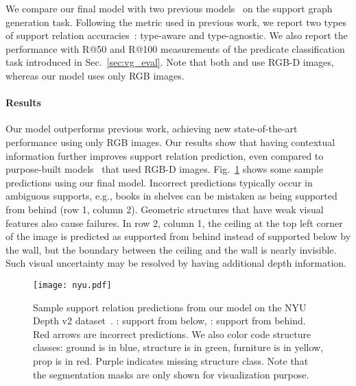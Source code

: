 \documentclass[10pt,twocolumn,letterpaper]{article}
\begin{document}
We compare our final model with two previous models~\cite{nyudepth,liao2016support} on the support graph generation task. Following the metric used in previous work, we report two types of support relation accuracies~\cite{nyudepth}: type-aware and type-agnostic. We also report the performance with R@50 and R@100 measurements of the predicate classification task introduced in Sec.~\ref{sec:vg_eval}. Note that both \cite{nyudepth} and \cite{liao2016support} use RGB-D images, whereas our model uses only RGB images.
 \vspace*{-15pt}

\paragraph{Results} Our model outperforms previous work, achieving new state-of-the-art performance using only RGB images. Our results show that having contextual information further improves support relation prediction, even compared to purpose-built models~\cite{liao2016support,nyudepth} that used RGB-D images. Fig.~\ref{fig:nyu} shows some sample predictions using our final model. Incorrect predictions typically occur in ambiguous supports, e.g., books in shelves can be mistaken as being supported from behind (row 1, column 2). Geometric structures that have weak visual features also cause failures. In row 2, column 1, the ceiling at the top left corner of the image is predicted as supported from behind instead of supported below by the wall, but the boundary between the ceiling and the wall is nearly invisible. Such visual uncertainty may be resolved by having additional depth information.



\begin{figure}[t!]
\begin{center}
\texttt{[image: nyu.pdf]}
\caption{Sample support relation predictions from our model on the NYU Depth v2 dataset~\cite{nyudepth}. : support from below, : support from behind. Red arrows are incorrect predictions. We also color code structure classes: ground is in blue, structure is in green, furniture is in yellow, prop is in red. Purple indicates missing structure class. Note that the segmentation masks are only shown for visualization purpose.}
\label{fig:nyu}
\end{center}
 \vspace*{-20pt}

\end{figure}
\end{document}
